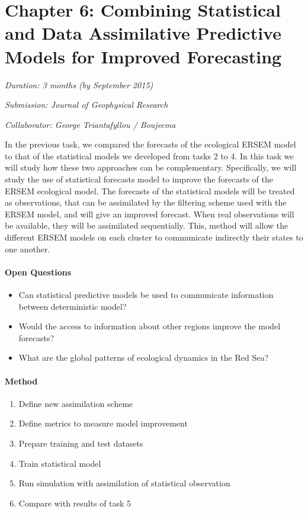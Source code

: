 \section{Chapter 6: Combining Statistical and Data Assimilative Predictive Models for Improved Forecasting}

\noindent
\emph{Duration: 3 months (by September 2015)}

\noindent
\emph{Submission: Journal of Geophysical Research}

\noindent
\emph{Collaborator: George Triantafyllou / Boujeema}

In the previous task, we compared the forecasts of the ecological ERSEM model to that of the statistical models we developed from tasks 2 to 4. In this task we will study how these two approaches can be complementary. Specifically, we will study the use of statistical forecasts model to improve the forecasts of the ERSEM ecological model. The forecasts of the statistical models will be treated as observations, that can be assimilated by the filtering scheme used with the ERSEM model, and will give an improved forecast. When real observations will be available, they will be assimilated sequentially. This, method will allow the different ERSEM models on each cluster to communicate indirectly their states to one another. 

\paragraph{Open Questions}

\begin{itemize}
\item Can statistical predictive models be used to communicate information between deterministic model?
\item Would the access to information about other regions improve the model forecasts?
\item What are the global patterns of ecological dynamics in the Red Sea?
\end{itemize}

\paragraph{Method}

\begin{enumerate}
\item Define new assimilation scheme
\item Define metrics to measure model improvement
\item Prepare training and test datasets
\item Train statistical model
\item Run simulation with assimilation of statistical observation
\item Compare with results of task 5
\end{enumerate}

